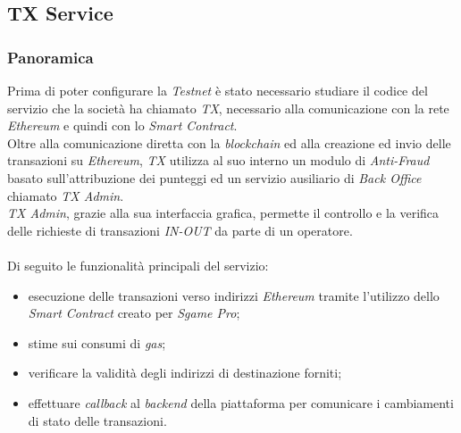 \documentclass[11pt]{thesistemp}
\begin{document}
\subsection{TX Service}

\subsubsection{Panoramica}

Prima di poter configurare la \textit{Testnet} è stato necessario studiare il codice del servizio che la società ha chiamato \textit{TX}, necessario alla comunicazione con la rete \textit{Ethereum} e quindi con lo \textit{Smart Contract}.\\
Oltre alla comunicazione diretta con la \textit{blockchain} ed alla creazione ed invio delle transazioni su \textit{Ethereum}, \textit{TX} utilizza al suo interno un modulo di \textit{Anti-Fraud} basato sull'attribuzione dei punteggi ed un servizio ausiliario di \textit{Back Office} chiamato \textit{TX Admin}.\\
\textit{TX Admin}, grazie alla sua interfaccia grafica, permette il controllo e la verifica delle richieste di transazioni \textit{IN-OUT} da parte di un operatore.\\\\
Di seguito le funzionalità principali del servizio:
\begin{itemize}
	\item esecuzione delle transazioni verso indirizzi \textit{Ethereum} tramite l'utilizzo dello \textit{Smart Contract} creato per \textit{Sgame Pro};
	\item stime sui consumi di \textit{gas};
	\item verificare la validità degli indirizzi di destinazione forniti;
	\item effettuare \textit{callback} al \textit{backend} della piattaforma per comunicare i cambiamenti di stato delle transazioni.
\end{itemize}
\end{document}
